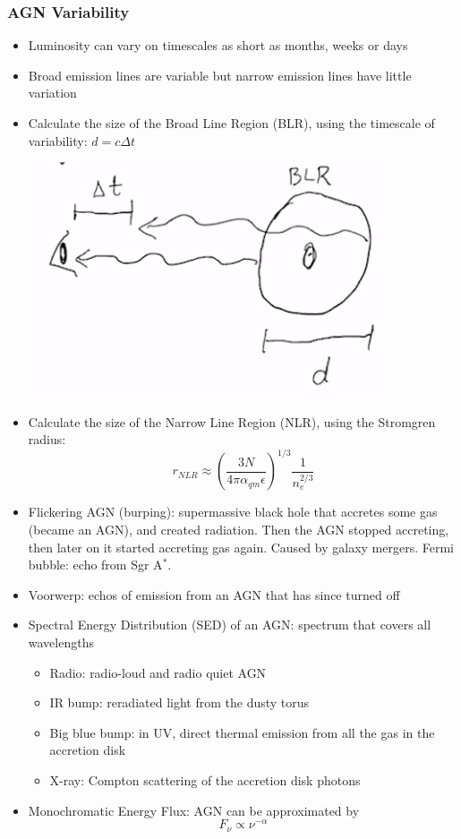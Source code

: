 \documentclass{book}
\begin{document}
\subsubsection{AGN Variability}
\begin{itemize}
    \item Luminosity can vary on timescales as short as months, weeks or days
    \item Broad emission lines are variable but narrow emission lines have little variation
    \item Calculate the size of the Broad Line Region (BLR), using the timescale of variability: $d = c \Delta t$
          \begin{center}
              \includegraphics[height = 0.3 \textwidth]{images/broad_line.png}
          \end{center}
    \item Calculate the size of the Narrow Line Region (NLR), using the Stromgren radius:
          \begin{equation*}
              r_{NLR} \approx \left( \frac{3N}{4 \pi \alpha_{qm} \epsilon} \right)^{1/3} \frac{1}{n_e^{2/3}} \tag{C\&O 28.13}
          \end{equation*}
    \item Flickering AGN (burping): supermassive black hole that accretes some gas (became an AGN), and created radiation. Then the AGN stopped accreting, then later on it started accreting gas again. Caused by galaxy mergers. Fermi bubble: echo from Sgr A$^*$.
    \item Voorwerp: echos of emission from an AGN that has since turned off
    \item Spectral Energy Distribution (SED) of an AGN: spectrum that covers all wavelengths
          \begin{itemize}
              \item Radio: radio-loud and radio quiet AGN
              \item IR bump: reradiated light from the dusty torus
              \item Big blue bump: in UV, direct thermal emission from all the gas in the accretion disk
              \item X-ray: Compton scattering of the accretion disk photons
          \end{itemize}
    \item Monochromatic Energy Flux: AGN can be approximated by
          \begin{equation*}
              F_\nu \propto \nu^{-\alpha} \tag{C\&O 28.1}
          \end{equation*}
\end{itemize}
\end{document}
